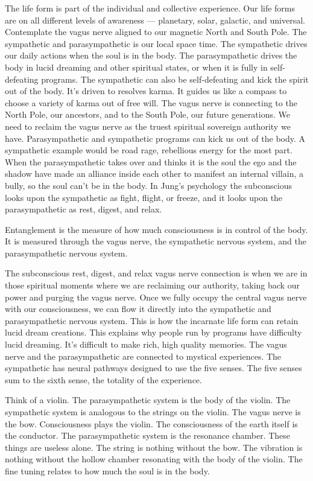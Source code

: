 The life form is part of the individual and collective experience. Our
life forms are on all different levels of awareness --- planetary,
solar, galactic, and universal. Contemplate the vagus nerve aligned to
our magnetic North and South Pole. The sympathetic and parasympathetic
is our local space time. The sympathetic drives our daily actions when
the soul is in the body. The parasympathetic drives the body in lucid
dreaming and other spiritual states, or when it is fully in
self-defeating programs. The sympathetic can also be self-defeating and
kick the spirit out of the body. It's driven to resolves karma. It
guides us like a compass to choose a variety of karma out of free will.
The vagus nerve is connecting to the North Pole, our ancestors, and to
the South Pole, our future generations. We need to reclaim the vagus
nerve as the truest spiritual sovereign authority we have.
Parasympathetic and sympathetic programs can kick us out of the body. A
sympathetic example would be road rage, rebellious energy for the most
part. When the parasympathetic takes over and thinks it is the soul the
ego and the shadow have made an alliance inside each other to manifest
an internal villain, a bully, so the soul can't be in the body. In
Jung's psychology the subconscious looks upon the sympathetic as fight,
flight, or freeze, and it looks upon the parasympathetic as rest,
digest, and relax.

Entanglement is the measure of how much consciousness is in control of
the body. It is measured through the vagus nerve, the sympathetic
nervous system, and the parasympathetic nervous system.

The subconscious rest, digest, and relax vagus nerve connection is when
we are in those spiritual moments where we are reclaiming our authority,
taking back our power and purging the vagus nerve. Once we fully occupy
the central vagus nerve with our consciousness, we can flow it directly
into the sympathetic and parasympathetic nervous system. This is how the
incarnate life form can retain lucid dream creations. This explains why
people run by programs have difficulty lucid dreaming. It's difficult to
make rich, high quality memories. The vagus nerve and the
parasympathetic are connected to mystical experiences. The sympathetic
has neural pathways designed to use the five senses. The five senses sum
to the sixth sense, the totality of the experience.

Think of a violin. The parasympathetic system is the body of the violin.
The sympathetic system is analogous to the strings on the violin. The
vagus nerve is the bow. Consciousness plays the violin. The
consciousness of the earth itself is the conductor. The parasympathetic
system is the resonance chamber. These things are useless alone. The
string is nothing without the bow. The vibration is nothing without the
hollow chamber resonating with the body of the violin. The fine tuning
relates to how much the soul is in the body.


